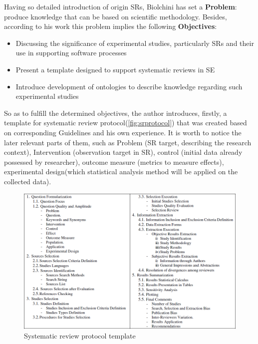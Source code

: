 	Having so detailed introduction of origin SRs, Biolchini has set a \textbf{Problem}: produce knowledge that can be based on scientific methodology. Besides, according to his work this problem implies the following \textbf{Objectives}:
		\begin{itemize}
			\item Discussing the significance of experimental studies, particularly SRs and their use in supporting software processes
			\item Present a template designed to support systematic reviews in SE
			\item Introduce development of ontologies to describe knowledge regarding such experimental studies
		\end{itemize}
	\label{sec:OntSRinSE:guidelines}    
	So as to fulfill the determined objectives, the author introduces, firstly, a template for systematic review protocol(\autoref{fig:srprotocol}) that was created based on corresponding Guidelines\cite{Kit07} and his own experience. It is worth to notice the later relevant parts of them, such as Problem (SR target, describing the research context), Intervention (observation target in SR), control (initial data already possessed by researcher), outcome measure (metrics to measure effects), experimental design(which statistical analysis method will be applied on the collected data).
	\begin{figure}
		\centering
		\includegraphics[width=15cm]{images/SRreviewprotocol.PNG}
		\caption{Systematic review protocol template\cite{Bio07}}
		\label{fig:srprotocol}
	\end{figure}
	 \newline
	
